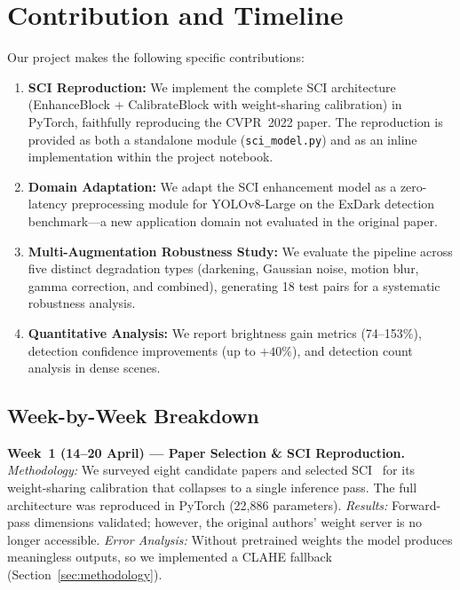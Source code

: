 \documentclass[conference]{IEEEtran}
\begin{document}
\section{Contribution and Timeline}
\label{sec:contribution}

Our project makes the following specific contributions:

\begin{enumerate}
  \item \textbf{SCI Reproduction:} We implement the complete SCI
  architecture (EnhanceBlock + CalibrateBlock with weight-sharing
  calibration) in PyTorch, faithfully reproducing the CVPR~2022 paper.
  The reproduction is provided as both a standalone module
  (\texttt{sci\_model.py}) and as an inline implementation within the
  project notebook.

  \item \textbf{Domain Adaptation:} We adapt the SCI enhancement model as
  a zero-latency preprocessing module for YOLOv8-Large on the ExDark
  detection benchmark---a new application domain not evaluated in the
  original paper.

  \item \textbf{Multi-Augmentation Robustness Study:} We evaluate the
  pipeline across five distinct degradation types (darkening, Gaussian
  noise, motion blur, gamma correction, and combined), generating 18 test
  pairs for a systematic robustness analysis.

  \item \textbf{Quantitative Analysis:} We report brightness gain metrics
  (74--153\%), detection confidence improvements (up to $+40\%$), and
  detection count analysis in dense scenes.
\end{enumerate}

\subsection{Week-by-Week Breakdown}

\textbf{Week~1 (14--20 April) --- Paper Selection \& SCI Reproduction.}
\emph{Methodology:}
We surveyed eight candidate papers and selected
SCI~\cite{ma2022sci} for its weight-sharing calibration that
collapses to a single inference pass.  The full architecture was
reproduced in PyTorch (22,886 parameters).
\emph{Results:}
Forward-pass dimensions validated; however, the original authors'
weight server is no longer accessible.
\emph{Error Analysis:}
Without pretrained weights the model produces meaningless outputs,
so we implemented a CLAHE fallback
(Section~\ref{sec:methodology}).
\end{document}
